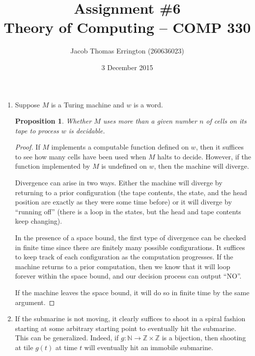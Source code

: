 \documentclass[letterpaper,11pt]{article}
\author{Jacob Thomas Errington (260636023)}
\title{Assignment \#6\\Theory of Computing -- COMP 330}
\date{3 December 2015}
\newtheorem{proposition}{Proposition}
\newcommand{\Z}{\mathbb{Z}}
\newcommand{\N}{\mathbb{N}}
\begin{document}
\maketitle

\begin{enumerate}
    \item
        Suppose $M$ is a Turing machine and $w$ is a word.

        \begin{proposition}
            Whether $M$ uses more than a given number $n$ of cells on its tape
            to process $w$ is decidable.
        \end{proposition}

        \begin{proof}
            If $M$ implements a computable function defined on $w$, then it
            suffices to see how many cells have been used when $M$ halts to
            decide. However, if the function implemented by $M$ is undefined on
            $w$, then the machine will diverge.

            Divergence can arise in two ways. Either the machine will diverge
            by returning to a prior configuration (the tape contents, the
            state, and the head position are exactly as they were some time
            before) or it will diverge by ``running off'' (there is a loop in
            the states, but the head and tape contents keep changing).

            In the presence of a space bound, the first type of divergence can
            be checked in finite time since there are finitely many possible
            configurations. It suffices to keep track of each
            configuration as the computation progresses. If the machine returns
            to a prior computation, then we know that it will loop forever
            within the space bound, and our decision process can output ``NO''.

            If the machine leaves the space bound, it will do so in finite time
            by the same argument.
        \end{proof}

    \item
        If the submarine is not moving, it clearly suffices to shoot in a
        spiral fashion starting at some arbitrary starting point to eventually
        hit the submarine. This can be generalized. Indeed, if
        $g : \N \to \Z \times \Z$ is a bijection, then shooting at tile $g(t)$
        at time $t$ will eventually hit an immobile submarine.


\end{enumerate}
\end{document}
